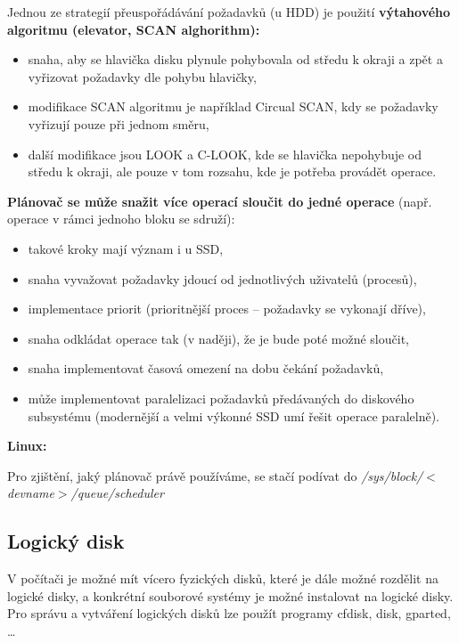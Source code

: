 \documentclass[a4paper, 11pt]{article}
\begin{document}
Jednou ze strategií přeuspořádávání požadavků (u HDD) je použití \textbf{výtahového algoritmu (elevator, SCAN alghorithm):}
\begin{itemize}
    \item snaha, aby se hlavička disku plynule pohybovala od středu k okraji a zpět a vyřizovat požadavky dle pohybu hlavičky,
    \item modifikace SCAN algoritmu je například Circual SCAN, kdy se požadavky vyřizují pouze při jednom směru,
    \item další modifikace jsou LOOK a C-LOOK, kde se hlavička nepohybuje od středu k okraji, ale pouze v tom rozsahu, kde je potřeba provádět operace.
\end{itemize}
 
\textbf{Plánovač se může snažit více operací sloučit do jedné operace} (např. operace v rámci jednoho bloku se sdruží):
\begin{itemize}
    \item takové kroky mají význam i u SSD,
    \item snaha vyvažovat požadavky jdoucí od jednotlivých uživatelů (procesů),
    \item implementace priorit (prioritnější proces -- požadavky se vykonají dříve),
    \item snaha odkládat operace tak (v naději), že je bude poté možné sloučit,
    \item snaha implementovat časová omezení na dobu čekání požadavků,
    \item může implementovat paralelizaci požadavků předávaných do diskového subsystému (modernější a velmi výkonné SSD umí řešit operace paralelně).
\end{itemize}

\textbf{Linux:}

Pro zjištění, jaký plánovač právě používáme, se stačí podívat do \textit{/sys/block/$<$devname$>$/queue/scheduler}

\subsection{Logický disk} \label{5.11}
V počítači je možné mít vícero fyzických disků, které je dále možné rozdělit na logické disky, a konkrétní souborové systémy je možné instalovat na logické disky. Pro správu a vytváření logických disků lze použít programy cfdisk, disk, gparted, \ldots
\end{document}
